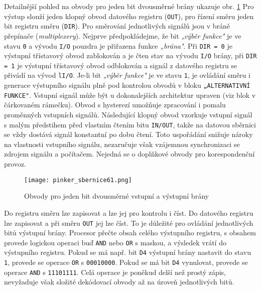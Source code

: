       Detailnější pohled na obvody pro jeden bit dvousměrné brány ukazuje obr. 
      \ref{MIT:fig_sbernice61} Pro výstup slouží jeden klopný obvod datového registru 
      (\texttt{OUT}), pro řízení směru jeden bit registru směru (\texttt{DIR}). Pro směrování 
      jednotlivých signálů jsou v bráně přepínače (\emph{multiplexery}). Nejprve předpokládejme, že 
      bit \emph{„výběr funkce"} je ve stavu \texttt{0} a vývodu \texttt{I/O} pouzdra je přiřazena 
      funkce \emph{„brána"}. Při \texttt{DIR = 0} je výstupní třístavový obvod zablokován a je čten 
      stav na vývodu \texttt{I/O} brány, při \texttt{DIR = 1} je výstupní třístavový obvod 
      odblokován a signál z datového registru se přivádí na vývod \texttt{lI/O}. Je-li bit 
      \emph{„výběr funkce"} je ve stavu \texttt{1}, je ovládání směru i generace výstupního signálu 
      plně pod kontrolou obvodů v bloku \texttt{„ALTERNATIVNÍ FUNKCE"}. Vstupní signál může být u 
      dokonalejších architektur upraven (viz blok v čárkovaném rámečku). Obvod s hysterezí umožňuje 
      zpracování i pomalu proměnných vstupních signálů. Následující klopný obvod vzorkuje vstupní 
      signál s malým předstihem před vlastním čtením bitu \texttt{IN/OUT}, takže na datovou 
      sběrnici se vždy dostává signál konstantní po dobu čtení. Toto uspořádání snižuje nároky na 
      vlastnosti vstupního signálu, nezaručuje však vzájemnou synchronizaci se zdrojem signálu a 
      počítačem. Nejedná se o doplňkové obvody pro korespondenční provoz.

      \begin{figure}[ht!] %
        \centering
        \texttt{[image: pinker\_sbernice61.png]}
        \caption{Obvody pro jeden bit dvousměrné vstupní a výstupní brány}
        \label{MIT:fig_sbernice61}
      \end{figure}
      
      Do registru směru lze zapisovat a lze jej pro kontrolu i číst. Do datového registru lze 
      zapisovat a při směru \texttt{OUT} jej lze číst. To je důležité pro ovládání jednotlivých 
      bitů výstupní brány. Procesor přečte obsah celého výstupního registru, s obsahem provede 
      logickou operaci buď \texttt{AND} nebo \texttt{OR} s maskou, a výsledek vrátí do výstupního 
      registru. Pokud se má např. bit \texttt{D4} výstupní brány nastavit do stavu \texttt{1}, 
      provede se operace \texttt{OR} s \texttt{00010000}. Pokud se má bit \texttt{D4} vynulovat, 
      provede se operace \texttt{AND} s \texttt{11101111}. Celá operace je poněkud delší než prostý 
      zápis, nevyžaduje však složité dekódovací obvody až na úroveň jednotlivých bitů.

